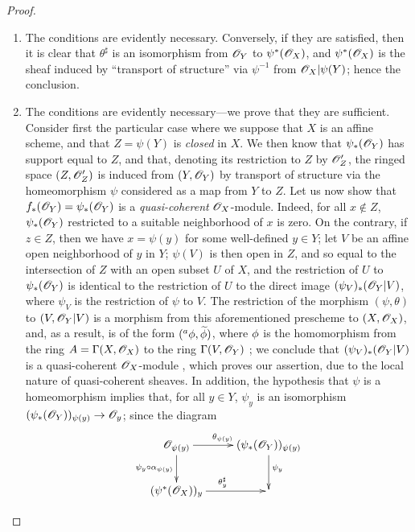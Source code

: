 \begin{proof}
\label{proof-1.4.2.2}
\medskip\noindent
\begin{enumerate}[label=(\alph*)]
  \item The conditions are evidently necessary.
    Conversely, if they are satisfied, then it is clear that $\theta^\sharp$ is an isomorphism from $\mathscr{O}_Y$ to $\psi^*(\mathscr{O}_X)$, and $\psi^*(\mathscr{O}_X)$ is the sheaf induced by ``transport of structure'' via $\psi^{-1}$ from $\mathscr{O}_X|\psi(Y)$;
    hence the conclusion.
  \item The conditions are evidently necessary---we prove that they are sufficient.
    Consider first the particular case where we suppose that $X$ is an affine scheme, and that $Z=\psi(Y)$ is \emph{closed} in $X$.
    We then know  that $\psi_*(\mathscr{O}_Y)$ has support equal to $Z$, and that, denoting its restriction to $Z$ by $\mathscr{O}_Z'$, the ringed space $(Z,\mathscr{O}_Z')$ is induced from $(Y,\mathscr{O}_Y)$ by transport of structure via the homeomorphism $\psi$ considered as a map from $Y$ to $Z$.
    Let us now show that $f_*(\mathscr{O}_Y)=\psi_*(\mathscr{O}_Y)$ is a \emph{quasi-coherent} $\mathscr{O}_X$-module.
    Indeed, for all $x\not\in Z$, $\psi_*(\mathscr{O}_Y)$ restricted to a suitable neighborhood of $x$ is zero.
    On the contrary, if $z\in Z$, then we have $x=\psi(y)$ for some well-defined $y\in Y$;
    let $V$ be an affine open neighborhood of $y$ in $Y$;
    $\psi(V)$ is then open in $Z$, and so equal to the intersection of $Z$ with an open subset $U$ of $X$, and the restriction of $U$ to $\psi_*(\mathscr{O}_Y)$ is identical to the restriction of $U$ to the direct image
    $(\psi_V)_*(\mathscr{O}_Y|V)$, where $\psi_V$ is the restriction of $\psi$ to $V$.
    The restriction of the morphism $(\psi,\theta)$ to $(V,\mathscr{O}_Y|V)$ is a morphism from this aforementioned prescheme to $(X,\mathscr{O}_X)$, and, as a result, is of the form $({}^a\phi,{\widetilde{\phi}})$, where $\phi$ is the homomorphism from the ring $A=\Gamma(X,\mathscr{O}_X)$ to the ring $\Gamma(V,\mathscr{O}_Y)$ ;
    we conclude that $(\psi_V)_*(\mathscr{O}_Y|V)$ is a quasi-coherent $\mathscr{O}_X$-module , which proves our assertion, due to the local nature of quasi-coherent sheaves.
    In addition, the hypothesis that $\psi$ is a homeomorphism implies  that, for all $y\in Y$, $\psi_y$ is an isomorphism $(\psi_*(\OO_Y))_{\psi(y)}\to\OO_y$;
    since the diagram
    \[
      \xymatrix{
        \OO_{\psi(y)}\ar[r]^{\theta_{\psi(y)}}\ar[d]_{\psi_y\circ\alpha_{\psi(y)}} &
        (\psi_*(\OO_Y))_{\psi(y)}\ar[d]^{\psi_y}\\
        (\psi^*(\OO_X))_y\ar[r]^{\theta_y^\sharp} &
}\]
\end{enumerate}
\end{proof}
